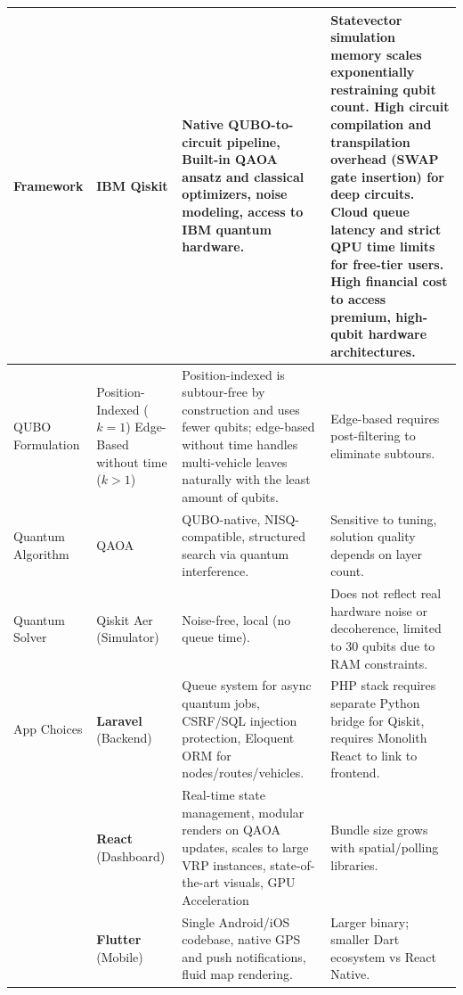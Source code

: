 \documentclass[a4paper]{report}
\begin{document}
{\begin{itemize}
\begin{longtable}{|>{\raggedright\arraybackslash}p{3cm}|>{\raggedright\arraybackslash}p{2.5cm}|>{\raggedright\arraybackslash}p{4.5cm}|>{\raggedright\arraybackslash}p{4.5cm}|}
\hline
\endlastfoot

Framework & 
IBM Qiskit & 
Native QUBO-to-circuit pipeline, Built-in QAOA ansatz and classical optimizers, noise modeling, access to IBM quantum hardware. & 
Statevector simulation memory scales exponentially restraining qubit count. High circuit compilation and transpilation overhead (SWAP gate insertion) for deep circuits. Cloud queue latency and strict QPU time limits for free-tier users. High financial cost to access premium, high-qubit hardware architectures. \\
\hline

QUBO Formulation &
Position-Indexed ($k=1$) \newline Edge-Based without time ($k>1$) &
Position-indexed is subtour-free by construction and uses fewer qubits; edge-based without time handles multi-vehicle leaves naturally with the least amount of qubits. &
Edge-based requires post-filtering to eliminate subtours. \\
\hline

Quantum Algorithm &
QAOA &
QUBO-native, NISQ-compatible, structured search via quantum interference. &
Sensitive to tuning, solution quality depends on layer count. \\
\hline

Quantum Solver &
Qiskit Aer (Simulator) &
Noise-free, local (no queue time). &
Does not reflect real hardware noise or decoherence, limited to 30 qubits due to RAM constraints. \\
\hline

App Choices &
\textbf{Laravel} \newline (Backend) & 
Queue system for async quantum jobs, CSRF/SQL injection protection, Eloquent ORM for nodes/routes/vehicles. &
PHP stack requires separate Python bridge for Qiskit, requires Monolith React to link to frontend. \\
\cline{2-4}

& \textbf{React} \newline (Dashboard) & 
Real-time state management, modular renders on QAOA updates, scales to large VRP instances, state-of-the-art visuals, GPU Acceleration &
Bundle size grows with spatial/polling libraries. \\
\cline{2-4}

& \textbf{Flutter} \newline (Mobile) & 
Single Android/iOS codebase, native GPS and push notifications, fluid map rendering. &
Larger binary; smaller Dart ecosystem vs React Native. \\


\end{longtable}
\end{itemize}}
\end{document}
